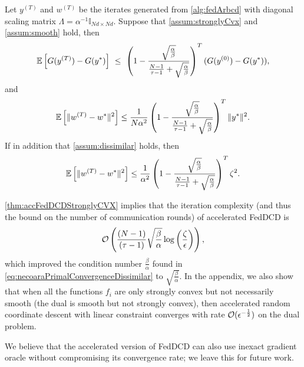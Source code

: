 \begin{theorem} \label{thm:accFedDCDStronglyCVX}
    Let $y^{(T)}$ and $w^{(T)}$ be the iterates generated from \autoref{alg:fedArbcd} with diagonal scaling matrix $\Lambda = \alpha^{-1} \mathbb{I}_{Nd \times Nd}$. Suppose that \autoref{assum:stronglyCvx} and \autoref{assum:smooth} hold, then
   \begin{equation} \label{eq:necoaraDualConvergenceStrongCVXAcc}
       \mathbb{E} \left[ G( y^{(T)} ) - G( y^* ) \right] ~\leq~ \left( 1 - \frac{ \sqrt{\frac{\alpha}{\beta}} }{ \frac{N-1}{\tau -1}+ \sqrt{\frac{\alpha}{\beta}} } \right)^{T} ( G(y^{(0)}) - G(y^*) ),
   \end{equation}
   and
   \begin{equation} \label{eq:necoaraPrimalConvergenceStrongCVXAcc}
       \mathbb{E} \left[ \| w^{(T)} - w^* \|^2 \right] 
       \leq \frac{1}{N\alpha^2} \left( 1 - \frac{ \sqrt{\frac{\alpha}{\beta}} }{ \frac{N-1}{\tau -1}+ \sqrt{\frac{\alpha}{\beta}} } \right)^{T} \|y^*\|^2.
   \end{equation}
   If in addition that \autoref{assum:dissimilar} holds, then
   \begin{equation} \label{eq:necoaraPrimalConvergenceDissimilarAcc}
       \mathbb{E} \left[ \| w^{(T)} - w^* \|^2 \right] 
       \leq \frac{1}{\alpha^2} \left( 1 - \frac{ \sqrt{\frac{\alpha}{\beta}} }{ \frac{N-1}{\tau -1}+ \sqrt{\frac{\alpha}{\beta}} } \right)^{T} \zeta^2. 
   \end{equation}
\end{theorem}

\autoref{thm:accFedDCDStronglyCVX} implies that the iteration complexity (and thus the bound on the number of communication rounds) of accelerated FedDCD is 
\begin{equation}
        \mathcal{O}\left( \frac{(N-1) }{(\tau-1) } \sqrt{ \frac{\beta}{\alpha} } \log\left( \frac{ \zeta}{ \epsilon } \right) \right) , \label{eq:accFedDCDcomplexity}
\end{equation}
which improved the condition number $\frac{\beta}{\alpha}$ found in \eqref{eq:necoaraPrimalConvergenceDissimilar} to $\sqrt{\frac{\beta}{\alpha}}$. In the appendix, we also show that when all the functions $f_i$ are only strongly convex but not necessarily smooth (the dual is smooth but not strongly convex), then accelerated random coordinate descent with linear constraint converges with rate $\mathcal{O}( \epsilon^{-\frac{1}{2}} )$ on the dual problem.

We believe that the accelerated version of FedDCD can also use inexact gradient oracle without compromising its convergence rate; we leave this for future work.

